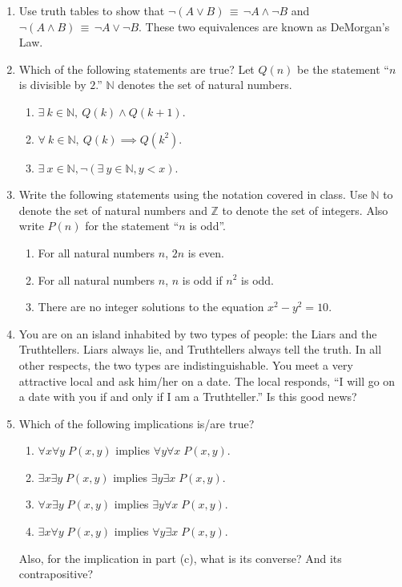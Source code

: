 \documentclass[11pt]{article}
\begin{document}
\maketitle

\begin{enumerate}

\item Use truth tables to show that $\neg (A\vee B) \,\equiv\, \neg A
\wedge \neg B$ and $\neg (A\wedge B) \,\equiv\, \neg A \vee \neg
B$. These two equivalences are known as DeMorgan's Law.

\item Which of the following statements are true? Let $Q(n)$
  be the statement ``$n$ is divisible by $2$.''  $\mathbb{N}$ denotes the
  set of natural numbers.
  \begin{enumerate}
    \item $\exists \ k\in \mathbb{N}, \ Q(k) \wedge Q(k+1)$.
    \item $\forall \ k\in \mathbb{N}, \ Q(k)\implies Q(k^2)$.
    \item $\exists \ x\in \mathbb{N}, \neg(\exists \ y\in \mathbb{N}, y < x)$.
  \end{enumerate}

\item Write the following statements using the notation covered in class. Use $\mathbb{N}$ to denote the set of natural numbers and $\mathbb{Z}$ to denote the
set of integers.  Also write $P(n)$ for the statement ``$n$ is odd''.
\begin{enumerate}
\item For all natural numbers $n$, $2n$ is even.
\item For all natural numbers $n$, $n$ is odd if $n^2$ is odd.
\item There are no integer solutions to the equation $x^2 - y^2 = 10$.
\end{enumerate}

\item You are on an island inhabited by two types of people: the Liars and the Truthtellers. Liars always lie, and Truthtellers always tell the truth. In all other respects, the two types are indistinguishable. You meet a very attractive local and ask him/her on a date. The local responds, ``I will go on a date with you if and only if I am a Truthteller.'' Is this good news?

\item 
  Which of the following implications is/are true?
  \begin{enumerate}
    \item $\forall x\forall y \; P(x,y)$ implies $\forall y\forall x \; P(x,y)$.
    \item $\exists x\exists y \; P(x,y)$ implies $\exists y\exists x \; P(x,y)$.
    \item $\forall x\exists y \; P(x,y)$ implies $\exists y\forall x \; P(x,y)$.
    \item $\exists x\forall y \; P(x,y)$ implies $\forall y\exists x \; P(x,y)$.
  \end{enumerate}
  Also, for the implication in part (c), what is its converse? And its
  contrapositive?


\end{enumerate}
\end{document}
